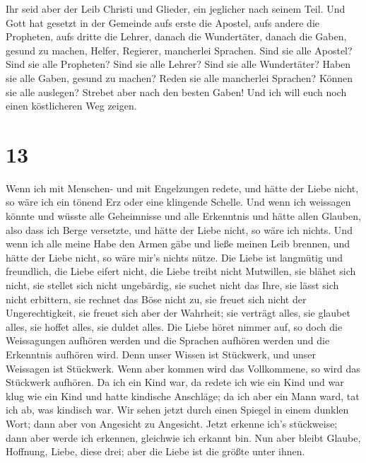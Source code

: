 Ihr seid aber der Leib Christi und Glieder, ein
jeglicher nach seinem Teil.  Und Gott hat gesetzt in der
Gemeinde aufs erste die Apostel, aufs andere die Propheten, aufs dritte
die Lehrer, danach die Wundertäter, danach die Gaben, gesund zu machen,
Helfer, Regierer, mancherlei Sprachen.  Sind sie alle
Apostel? Sind sie alle Propheten? Sind sie alle Lehrer? Sind sie alle
Wundertäter?  Haben sie alle Gaben, gesund zu machen?
Reden sie alle mancherlei Sprachen? Können sie alle auslegen?
 Strebet aber nach den besten Gaben! Und ich will euch
noch einen köstlicheren Weg zeigen.

\hypertarget{section-12}{%
\section{13}\label{section-12}}

 Wenn ich mit Menschen- und mit Engelzungen redete, und
hätte der Liebe nicht, so wäre ich ein tönend Erz oder eine klingende
Schelle.  Und wenn ich weissagen könnte und wüsste alle
Geheimnisse und alle Erkenntnis und hätte allen Glauben, also dass ich
Berge versetzte, und hätte der Liebe nicht, so wäre ich nichts.
 Und wenn ich alle meine Habe den Armen gäbe und ließe
meinen Leib brennen, und hätte der Liebe nicht, so wäre mir's nichts
nütze.  Die Liebe ist langmütig und freundlich, die Liebe
eifert nicht, die Liebe treibt nicht Mutwillen, sie blähet sich nicht,
 sie stellet sich nicht ungebärdig, sie suchet nicht das
Ihre, sie lässt sich nicht erbittern, sie rechnet das Böse nicht zu,
 sie freuet sich nicht der Ungerechtigkeit, sie freuet
sich aber der Wahrheit;  sie verträgt alles, sie glaubet
alles, sie hoffet alles, sie duldet alles.  Die Liebe
höret nimmer auf, so doch die Weissagungen aufhören werden und die
Sprachen aufhören werden und die Erkenntnis aufhören wird.
 Denn unser Wissen ist Stückwerk, und unser Weissagen ist
Stückwerk.  Wenn aber kommen wird das Vollkommene, so
wird das Stückwerk aufhören.  Da ich ein Kind war, da
redete ich wie ein Kind und war klug wie ein Kind und hatte kindische
Anschläge; da ich aber ein Mann ward, tat ich ab, was kindisch war.
 Wir sehen jetzt durch einen Spiegel in einem dunklen
Wort; dann aber von Angesicht zu Angesicht. Jetzt erkenne ich's
stückweise; dann aber werde ich erkennen, gleichwie ich erkannt bin.
 Nun aber bleibt Glaube, Hoffnung, Liebe, diese drei;
aber die Liebe ist die größte unter ihnen.

